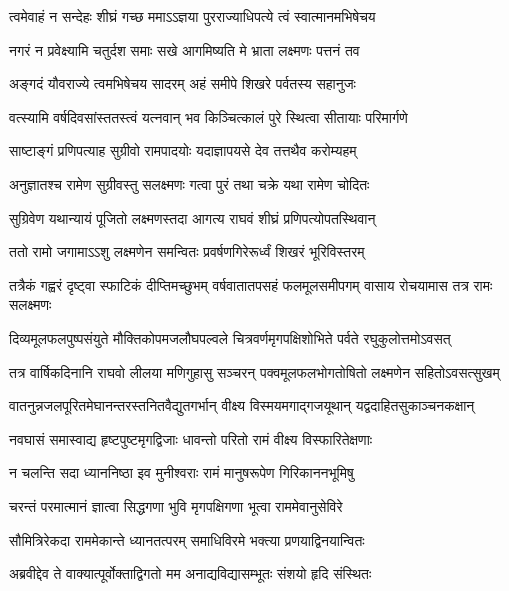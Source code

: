 \twolineshloka
{त्वमेवाहं न सन्देहः शीघ्रं गच्छ ममाऽऽज्ञया}
{पुरराज्याधिपत्ये त्वं स्वात्मानमभिषेचय} %

\twolineshloka
{नगरं न प्रवेक्ष्यामि चतुर्दश समाः सखे}
{आगमिष्यति मे भ्राता लक्ष्मणः पत्तनं तव} %

\twolineshloka
{अङ्गदं यौवराज्ये त्वमभिषेचय सादरम्}
{अहं समीपे शिखरे पर्वतस्य सहानुजः} %

\twolineshloka
{वत्स्यामि वर्षदिवसांस्ततस्त्वं यत्नवान् भव}
{किञ्चित्कालं पुरे स्थित्वा सीतायाः परिमार्गणे} %

\twolineshloka
{साष्टाङ्गं प्रणिपत्याह सुग्रीवो रामपादयोः}
{यदाज्ञापयसे देव तत्तथैव करोम्यहम्} %

\twolineshloka
{अनुज्ञातश्च रामेण सुग्रीवस्तु सलक्ष्मणः}
{गत्वा पुरं तथा चक्रे यथा रामेण चोदितः} %

\twolineshloka
{सुग्रिवेण यथान्यायं पूजितो लक्ष्मणस्तदा}
{आगत्य राघवं शीघ्रं प्रणिपत्योपतस्थिवान्} %

\twolineshloka
{ततो रामो जगामाऽऽशु लक्ष्मणेन समन्वितः}
{प्रवर्षणगिरेरूर्ध्वं शिखरं भूरिविस्तरम्} %

\threelineshloka
{तत्रैकं गह्वरं दृष्ट्वा स्फाटिकं दीप्तिमच्छुभम्}
{वर्षवातातपसहं फलमूलसमीपगम्}
{वासाय रोचयामास तत्र रामः सलक्ष्मणः} %

\twolineshloka
{दिव्यमूलफलपुष्पसंयुते मौक्तिकोपमजलौघपल्वले}
{चित्रवर्णमृगपक्षिशोभिते पर्वते रघुकुलोत्तमोऽवसत्} %





\twolineshloka
{तत्र वार्षिकदिनानि राघवो लीलया मणिगुहासु सञ्चरन्}
{पक्वमूलफलभोगतोषितो लक्ष्मणेन सहितोऽवसत्सुखम्} %

\twolineshloka
{वातनुन्नजलपूरितमेघानन्तरस्तनितवैद्युतगर्भान्}
{वीक्ष्य विस्मयमगाद्गजयूथान् यद्वदाहितसुकाञ्चनकक्षान्} %

\twolineshloka
{नवघासं समास्वाद्य हृष्टपुष्टमृगद्विजाः}
{धावन्तो परितो रामं वीक्ष्य विस्फारितेक्षणाः} %

\twolineshloka
{न चलन्ति सदा ध्याननिष्ठा इव मुनीश्वराः}
{रामं मानुषरूपेण गिरिकाननभूमिषु} %

\twolineshloka
{चरन्तं परमात्मानं ज्ञात्वा सिद्धगणा भुवि}
{मृगपक्षिगणा भूत्वा राममेवानुसेविरे} %

\twolineshloka
{सौमित्रिरेकदा राममेकान्ते ध्यानतत्परम्}
{समाधिविरमे भक्त्या प्रणयाद्विनयान्वितः} %

\twolineshloka
{अब्रवीद्देव ते वाक्यात्पूर्वोक्ताद्विगतो मम}
{अनाद्यविद्यासम्भूतः संशयो हृदि संस्थितः} %

